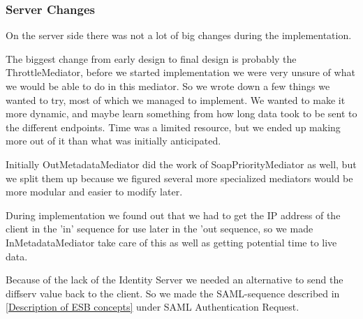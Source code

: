 \subsubsection{Server Changes}\label{Changes:Server}
    On the server side there was not a lot of big changes during the implementation.
    
    The biggest change from early design to final design is probably the ThrottleMediator, before we started implementation we were very unsure of what we would be able to do in this mediator. So we wrote down a few things we wanted to try, most of which we managed to implement. We wanted to make it more dynamic, and maybe learn something from how long data took to be sent to the different endpoints. Time was a limited resource, but we ended up making more out of it than what was initially anticipated.

    Initially OutMetadataMediator did the work of SoapPriorityMediator as well, but we split them up because we figured several more specialized mediators would be more modular and easier to modify later.

    During implementation we found out that we had to get the IP address of the client in the 'in' sequence for use later in the 'out sequence, so we made InMetadataMediator take care of this as well as getting potential time to live data.

    Because of the lack of the Identity Server we needed an alternative to send the diffserv value back to the client. So we made the SAML-sequence described in \ref{Description of ESB concepts} under SAML Authentication Request.